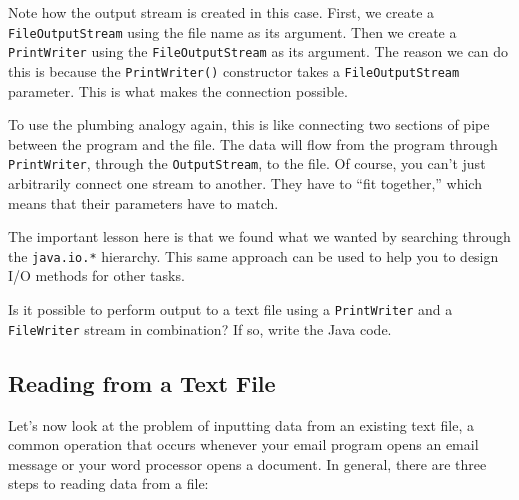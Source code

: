 \noindent Note how the output stream is created in this case.  First,
we create a {\tt FileOutputStream} using the file name as its
argument.  Then we create a {\tt PrintWriter} using the
{\tt FileOutputStream} as its argument.  The reason we can do this is
because the {\tt PrintWriter()} constructor takes a
{\tt FileOutputStream} parameter.  This is what makes the connection
possible.


To use the plumbing analogy again, this is like connecting two
sections of pipe between the program and the file.
The data will flow from the program through {\tt PrintWriter}, through
the {\tt OutputStream}, to the file.  Of course, you can't just
arbitrarily connect one stream to another.  They have to ``fit
together,'' which means that their parameters have to match.

\WWWjava

\noindent The important lesson here is that we found what we wanted by searching
through the {\tt java.io.*} hierarchy.  This same approach can be used
to help you to design I/O methods for other tasks.

\begin{SSTUDY}
\item  Is it possible to perform output to a text file using a
{\tt PrintWriter} and a {\tt FileWriter} stream in combination? If so,
write the Java code.
\end{SSTUDY}

\subsection{Reading from a Text File}
\noindent Let's now look at the problem of inputting data from an
existing text file, a common operation that occurs whenever your email
program opens an email message or your word processor opens a
document.  In general, there are three steps to reading data from a
file:

